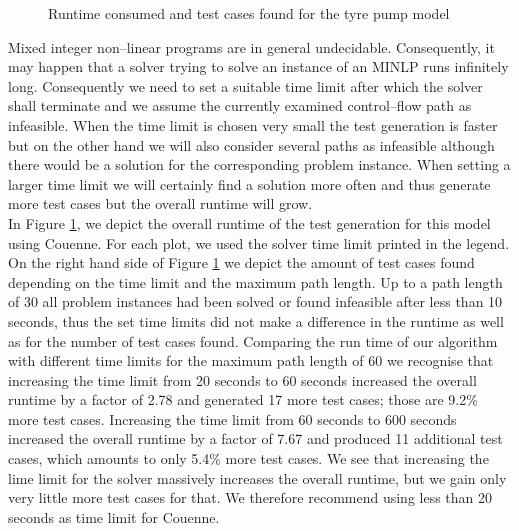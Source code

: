 \documentclass[runningheads,a4paper]{llncs}%
\begin{document}
\begin{figure}
%
\caption{Runtime consumed and test cases found for the tyre pump model%
}%
\label{fig:ExplodingTyresRuntime}%
\end{figure}%
Mixed integer non--linear programs are in general undecidable. Consequently, it may happen that a solver trying to solve an instance of an MINLP runs infinitely long. Consequently we need to set a suitable time limit after which the solver shall terminate and we assume the currently examined control--flow path as infeasible. When the time limit is chosen very small the test generation is faster but on the other hand we will also consider several paths as infeasible although there would be a solution for the corresponding problem instance. When setting a larger time limit we will certainly find a solution more often and thus generate more test cases but the overall runtime will grow.\\
In Figure \ref{fig:ExplodingTyresRuntime}, we depict the overall runtime of the test generation for this model using Couenne. For each plot, we used the solver time limit printed in the legend. On the right hand side of Figure \ref{fig:ExplodingTyresRuntime} we depict the amount of test cases found depending on the time limit and the maximum path length. Up to a path length of 30 all problem instances had been solved or found infeasible after less than 10 seconds, thus the set time limits did not make a difference in the runtime as well as for the number of test cases found. Comparing the run time of our algorithm with different time limits for the maximum path length of 60 we recognise that increasing the time limit from 20 seconds to 60 seconds increased the overall runtime by a factor of 2.78 and generated 17 more test cases; those are 9.2\% more test cases. Increasing the time limit from 60 seconds to 600 seconds increased the overall runtime by a factor of 7.67 and produced 11 additional test cases, which amounts to only 5.4\% more test cases. We see that increasing the lime limit for the solver massively increases the overall runtime, but we gain only very little more test cases for that. We therefore recommend using less than 20 seconds as time limit for Couenne.
\end{document}
